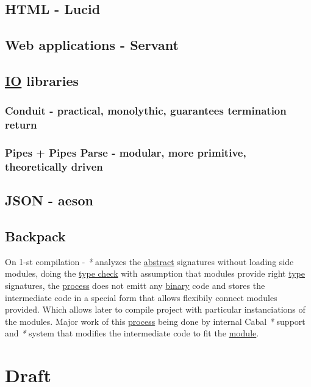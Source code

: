 \documentclass[a4paper,14pt,oneside]{book}
\begin{document}
\chapter{HTML - Lucid}
\label{sec:org033d378}

\chapter{Web applications - Servant}
\label{sec:orga085ee3}

\chapter{\hyperref[org97866a7]{IO} libraries}
\label{sec:orgec2c140}

\section{Conduit - practical, monolythic, guarantees termination return}
\label{sec:org01824da}

\section{Pipes + Pipes Parse - modular, more primitive, theoretically driven}
\label{sec:org1fcc7e1}

\chapter{JSON - aeson}
\label{sec:org9b23873}

\chapter{\label{org7317f8a}Backpack}
\label{sec:orga3eeabc}
On 1-st compilation - \emph{*} analyzes the \hyperref[orgb20e98c]{abstract} signatures without loading side modules, doing the \hyperref[org714fc2d]{type check} with assumption that modules provide right \hyperref[org7c4e373]{type} signatures, the \hyperref[org3033ff0]{process} does not emitt any \hyperref[orgacb7a42]{binary} code and stores the intermediate code in a special form that allows flexibily connect modules provided. Which allows later to compile project with particular instanciations of the modules. Major work of this \hyperref[org3033ff0]{process} being done by internal Cabal \emph{*} support and \emph{*} system that modifies the intermediate code to fit the \hyperref[org991ac94]{module}.

\part{Draft}
\label{sec:orga8d88d4}
\end{document}
